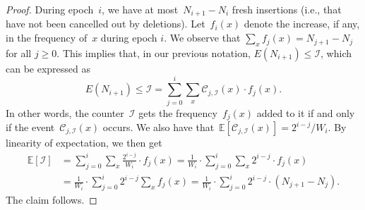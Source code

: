 \documentclass[sigconf]{acmart}
\newcommand{\expectation}[1]{\mathbb{E}\left[ #1 \right]}
\begin{document}
\begin{proof}
    During epoch~$i$, we have at most~$N_{i+1}-N_{i}$ fresh insertions (i.e.,
    that have not been cancelled out by deletions). Let~$f_i(x)$ denote the
    increase, if any, in the frequency of~$x$ during epoch $i$. We observe that
    $\sum_x f_j(x) = N_{j+1}-N_j$ for all $j\geq 0$. This implies that, in our previous
    notation, $E(N_{i+1}) \leq \mathcal{I}$, which can be expressed as
	$$ E(N_{i+1}) \leq \mathcal{I} =\sum_{j=0}^i   \sum_x \mathcal{C}_{j,\mathcal{I}}(x) \cdot f_j(x). $$
	\noindent
    In other words, the counter~$\mathcal{I}$ gets the frequency~$f_j(x)$ added
    to it if and only if the event~$\mathcal{C}_{j,\mathcal{I}}(x)$ occurs. We
    also have that~$\expectation{\mathcal{C}_{j,\mathcal{I}}(x)} =
    2^{i-j}/W_i$. By linearity of expectation, we then get
	\begin{align*}
		\expectation{\mathcal{I}} &= \sum_{j=0}^i   \sum_x \frac{2^{i-j}}{W_i} \cdot f_j(x) = \frac{1}{W_i} \cdot  \sum_{j=0}^i   \sum_x 2^{i-j} \cdot f_j(x)\\
		&=	\frac{1}{W_i} \cdot  \sum_{j=0}^i   2^{i-j}  \sum_x f_j(x) = \frac{1}{W_i} \cdot  \sum_{j=0}^i  2^{i-j} \cdot  (N_{j+1} - N_j).
	\end{align*}
	The claim follows.
\end{proof}
\end{document}
